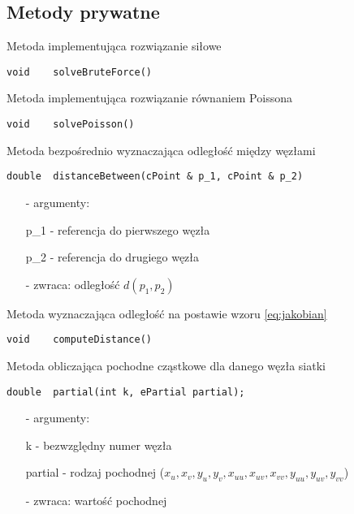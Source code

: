 \subsection{Metody prywatne}

\noindent Metoda implementująca rozwiązanie siłowe
\begin{lstlisting}[style = nonumbers]
	void	solveBruteForce()		
\end{lstlisting}
\color{white}{.}\color{black}{}		%

\noindent Metoda implementująca rozwiązanie równaniem Poissona
\begin{lstlisting}[style = nonumbers]
	void	solvePoisson()		
\end{lstlisting}
\color{white}{.}\color{black}{}		%

\noindent Metoda bezpośrednio wyznaczająca odległość między węzłami
\begin{lstlisting}[style = nonumbers]
	double	distanceBetween(cPoint & p_1, cPoint & p_2)
\end{lstlisting}
\vspace*{-.5cm}
\begin{enumerate} \itemsep1pt \parskip0pt 
	\item[-] \textsf{argumenty:} 
	\item[] p\_1 - referencja do pierwszego węzła
	\item[] p\_2 - referencja do drugiego węzła
	\item[-] \textsf{zwraca:} odległość $d(p_1,p_2)$	
\end{enumerate}

\noindent Metoda wyznaczająca odległość na postawie wzoru \ref{eq:jakobian}
\begin{lstlisting}[style = nonumbers]
	void	computeDistance()	
\end{lstlisting}
\color{white}{.}\color{black}{}		%

\noindent Metoda obliczająca pochodne cząstkowe dla danego węzła siatki
\begin{lstlisting}[style = nonumbers]
	double	partial(int k, ePartial partial);
\end{lstlisting}
\vspace*{-.5cm}
\begin{enumerate} \itemsep1pt \parskip0pt 
	\item[-] \textsf{argumenty:} 
	\item[] k - bezwzględny numer węzła 
	\item[] partial - rodzaj pochodnej ($x_u, x_v, y_u, y_v, x_{uu}, x_{uv}, x_{vv}, y_{uu}, y_{uv}, y_{vv}$)
	\item[-] \textsf{zwraca:} wartość pochodnej	
\end{enumerate}




